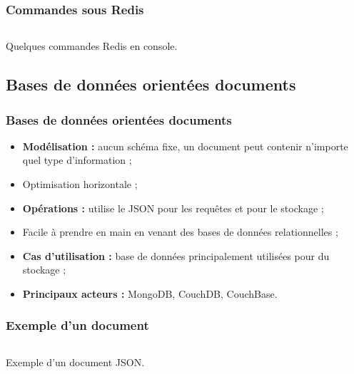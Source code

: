     \begin{frame}
        \frametitle{Commandes sous Redis}

        \begin{listing}[H]
            \inputminted[fontsize=\tiny, linenos=true]{text}{code/commandesRedis.txt}
            \caption{Quelques commandes Redis en console.}
        \end{listing}
    \end{frame}

    \subsection{Bases de données orientées documents}
    \begin{frame}
        \frametitle{Bases de données orientées documents}

        \begin{itemize}
            \item \textbf{Modélisation :} aucun schéma fixe, un document peut contenir n'importe quel type d'information ;
            \item Optimisation horizontale ;
            \item \textbf{Opérations :} utilise le JSON pour les requêtes et pour le stockage ;
            \item Facile à prendre en main en venant des bases de données relationnelles ;
            \item \textbf{Cas d'utilisation :} base de données principalement utilisées pour du stockage ;
            \item \textbf{Principaux acteurs :} MongoDB, CouchDB, CouchBase.
        \end{itemize}
    \end{frame}

    \begin{frame}
        \frametitle{Exemple d'un document}

        \begin{listing}[H]
            \inputminted[fontsize=\tiny, linenos=true]{json}{code/exemple-document.json}
            \caption{Exemple d'un document JSON.}
        \end{listing}
    \end{frame}



